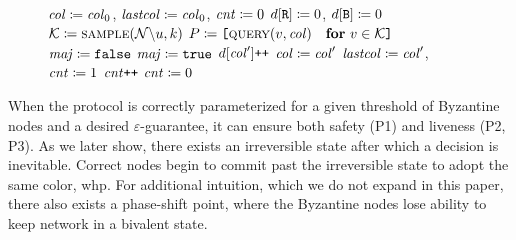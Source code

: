 \documentclass[letterpaper,twocolumn,10pt]{article}
\theoremstyle{definition}
\begin{document}
\begin{figure}[t]
    \small
\begin{algorithmic}[1]
        \State $\mathit{col} \coloneqq \mathit{col}_0$, $\mathit{lastcol} \coloneqq \mathit{col}_0$, $\mathit{cnt} \coloneqq 0$
        \State $d[\texttt{R}] \coloneqq 0$, $d[\texttt{B}] \coloneqq 0$
            \IIf{$\codecolor = \bot$} \Continue
            \State $\mathcal{K} \assign \Call{sample}{\mathcal{N}\backslash u, k}$
            \State $P \assign \texttt{[}\Call{query}{v, \codecolor}\quad\textbf{for}\ v \in \mathcal{K}\texttt{]}$
            \State $\mathit{maj} \coloneqq \texttt{false}$
                \State $\mathit{maj} \coloneqq \texttt{true}$
                \State $d[\mathit{col}']\texttt{++}$
                        \State$\mathit{col} \coloneqq \mathit{col}'$
                \EndIf
                    \State$\mathit{lastcol} \coloneqq \mathit{col}'$, $\mathit{cnt} \coloneqq 1$
                \Else\hspace{1ex}$\mathit{cnt}\texttt{++}$
                \EndIf
                \IIf {$\codecount \ge \beta$} 
            \EndIf
            \EndFor
            \IIf{$\codemaj = \codefalse$} $\mathit{cnt} \coloneqq 0$
        \EndWhile
    \EndProcedure
    \label{fig:snowball-loop}
\end{algorithmic}
\end{figure}


When the protocol is correctly parameterized for a given threshold of Byzantine nodes and a desired $\varepsilon$-guarantee, it can ensure both safety (P1) and liveness (P2, P3).
As we later show, there exists an irreversible state after which a decision is inevitable. Correct nodes begin to commit past the irreversible state to adopt the same color, whp. For additional intuition, which we do not expand in this paper, there also exists a phase-shift point, where the Byzantine nodes lose ability to keep network in a bivalent state.
\end{document}
